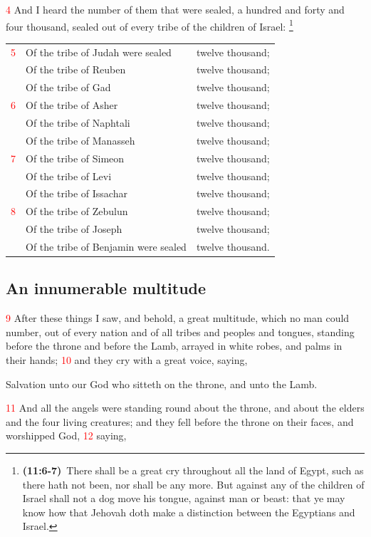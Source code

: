 \documentclass[12pt,twoside]{memoir}
\newcommand{\cbibleref}[3]{\textbf{\ibibleverse{#1}(#2)}\ {#3}}
\newcommand{\cbiblefoot}[3]{\footnote{\cbibleref{#1}{#2}{#3}}}
\newcommand{\vnum}[1]{\textcolor{red}{\normalsize{#1}}}
\begin{document}
\vnum{4} And I heard the number of them that were sealed, a hundred and forty and four thousand, sealed out of every tribe of the children of Israel:%
	\cbiblefoot{Exodus}{11:6-7}{There shall be a great cry throughout all the land of Egypt, such as there hath not been, nor shall be any more. But against any of the children of Israel shall not a dog move his tongue, against man or beast: that ye may know how that Jehovah doth make a distinction between the Egyptians and Israel.}
\\
\begin{flushleft}
\begin{tabular}{l l l}
\vnum{5} & Of the tribe of Judah were sealed & twelve thousand; \\
& Of the tribe of Reuben & twelve thousand; \\
& Of the tribe of Gad & twelve thousand; \\
\vnum{6} & Of the tribe of Asher & twelve thousand; \\
& Of the tribe of Naphtali & twelve thousand; \\
& Of the tribe of Manasseh & twelve thousand; \\
\vnum{7} & Of the tribe of Simeon & twelve thousand; \\
& Of the tribe of Levi & twelve thousand; \\
& Of the tribe of Issachar & twelve thousand;\\
\vnum{8} & Of the tribe of Zebulun & twelve thousand; \\
& Of the tribe of Joseph & twelve thousand; \\
& Of the tribe of Benjamin were sealed & twelve thousand.
\end{tabular}
\end{flushleft}

\subsection*{An innumerable multitude}
\vnum{9} After these things I saw, and behold, a great multitude, which no man could number, out of every nation and of all tribes and peoples and tongues, standing before the throne and before the Lamb, arrayed in white robes, and palms in their hands; %
\vnum{10} and they cry with a great voice, saying,

Salvation unto our God who sitteth on the throne, and unto the Lamb.

\vnum{11} And all the angels were standing round about the throne, and about the elders and the four living creatures; and they fell before the throne on their faces, and worshipped God, %
\vnum{12} saying,
\end{document}
